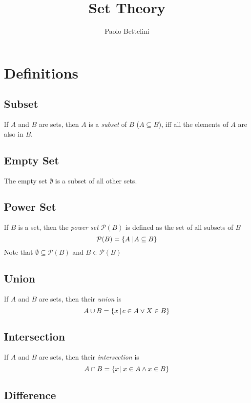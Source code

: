 \documentclass{article}
\title{Set Theory}
\author{Paolo Bettelini}
\date{}
\begin{document}
\maketitle
\tableofcontents
\pagebreak

\section{Definitions}

\subsection{Subset}

If \(A\) and \(B\) are sets, then \(A\) is a \textit{subset} of \(B\)
(\(A\subseteq B\)), iff all the elements of \(A\) are also in \(B\).

\subsection{Empty Set}

The empty set \(\emptyset\) is a subset of all other sets.

\subsection{Power Set}

If \(B\) is a set, then the \textit{power set} \(\mathcal{P}(B)\)
is defined as the set of all subsets of \(B\)
\[
    \mathcal{P}(B)=\{A \,|\, A\subseteq B\}
\]
Note that \(\emptyset\subseteq\mathcal{P}(B)\) and \(B\in\mathcal{P}(B)\)

\subsection{Union}

If \(A\) and \(B\) are sets, then their \textit{union} is
\[
    A \cup B = \{x \,|\, c \in A \lor X \in B\}
\]

\subsection{Intersection}

If \(A\) and \(B\) are sets, then their \textit{intersection} is
\[
    A \cap B = \{x \,|\, x \in A \land x \in B\}
\]

\subsection{Difference}
\end{document}

